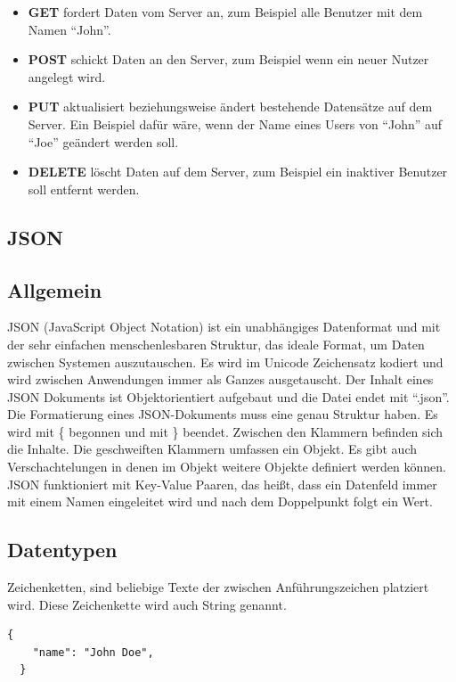 \begin{itemize}
  \item {\textbf{GET} fordert Daten vom Server an, zum Beispiel alle Benutzer mit dem Namen ``John''.}
  \item {\textbf{POST} schickt Daten an den Server, zum Beispiel wenn ein neuer Nutzer angelegt wird. }
  \item {\textbf{PUT} aktualisiert beziehungsweise ändert bestehende Datensätze auf dem Server. Ein Beispiel dafür wäre,
  wenn der Name eines Users von ``John'' auf ``Joe'' geändert werden soll. }
  \item {\textbf{DELETE} löscht Daten auf dem Server, zum Beispiel ein inaktiver Benutzer soll entfernt werden. }
\end{itemize}\cite{APCW20012}

\subsection{JSON}

\subsection*{Allgemein}
JSON (JavaScript Object Notation) ist ein unabhängiges Datenformat und mit der sehr einfachen menschenlesbaren Struktur, das ideale Format, um Daten
zwischen Systemen auszutauschen. Es wird im Unicode Zeichensatz kodiert und wird zwischen Anwendungen immer als Ganzes 
ausgetauscht. Der Inhalt eines JSON Dokuments ist Objektorientiert aufgebaut und die Datei endet mit ``.json''.
\\
Die Formatierung eines JSON-Dokuments muss eine genau Struktur haben. Es wird mit \{ begonnen und mit \} beendet. Zwischen den 
Klammern befinden sich die Inhalte. Die geschweiften Klammern umfassen ein Objekt. Es gibt auch Verschachtelungen in denen im Objekt
weitere Objekte definiert werden können. JSON funktioniert mit Key-Value Paaren, das heißt, dass ein Datenfeld immer mit einem 
Namen eingeleitet wird und nach dem Doppelpunkt folgt ein Wert. \cite{APCW20013}
\\
\subsection*{Datentypen}
Zeichenketten, sind beliebige Texte der zwischen Anführungszeichen platziert wird. Diese Zeichenkette wird auch String 
genannt. 
\begin{lstlisting}[caption=JSON Datentyp String]
  {
    "name": "John Doe",
  }
\end{lstlisting}

